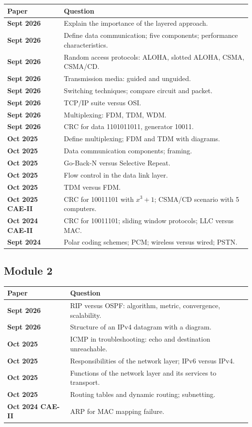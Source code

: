 \documentclass[11pt,a4paper]{article}
\begin{document}
\begin{center}\small
\begin{tabularx}{\textwidth}{>{\bfseries}p{} X}
\toprule Paper & Question\\
\midrule
Sept 2026 & Explain the importance of the layered approach.\\
Sept 2026 & Define data communication; five components; performance characteristics.\\
Sept 2026 & Random access protocols: ALOHA, slotted ALOHA, CSMA, CSMA/CD.\\
Sept 2026 & Transmission media: guided and unguided.\\
Sept 2026 & Switching techniques; compare circuit and packet.\\
Sept 2026 & TCP/IP suite versus OSI.\\
Sept 2026 & Multiplexing: FDM, TDM, WDM.\\
Sept 2026 & CRC for data 1101011011, generator 10011.\\
Oct 2025 & Define multiplexing; FDM and TDM with diagrams.\\
Oct 2025 & Data communication components; framing.\\
Oct 2025 & Go-Back-N versus Selective Repeat.\\
Oct 2025 & Flow control in the data link layer.\\
Oct 2025 & TDM versus FDM.\\
Oct 2025 CAE-II & CRC for 10011101 with $x^3+1$; CSMA/CD scenario with 5 computers.\\
Oct 2024 CAE-II & CRC for 10011101; sliding window protocols; LLC versus MAC.\\
Sept 2024 & Polar coding schemes; PCM; wireless versus wired; PSTN.\\
\bottomrule
\end{tabularx}
\end{center}

\subsection{Module 2}

\begin{center}\small
\begin{tabularx}{\textwidth}{>{\bfseries}p{} X}
\toprule Paper & Question\\
\midrule
Sept 2026 & RIP versus OSPF: algorithm, metric, convergence, scalability.\\
Sept 2026 & Structure of an IPv4 datagram with a diagram.\\
Oct 2025 & ICMP in troubleshooting: echo and destination unreachable.\\
Oct 2025 & Responsibilities of the network layer; IPv6 versus IPv4.\\
Oct 2025 & Functions of the network layer and its services to transport.\\
Oct 2025 & Routing tables and dynamic routing; subnetting.\\
Oct 2024 CAE-II & ARP for MAC mapping failure.\\
\bottomrule
\end{tabularx}
\end{center}
\end{document}
